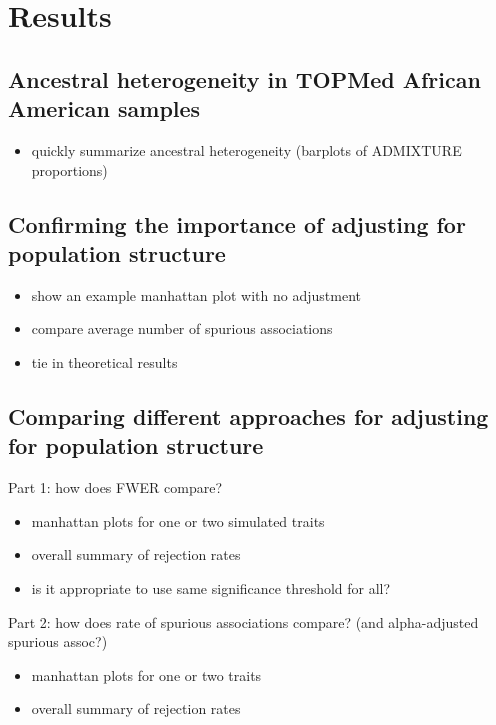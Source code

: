\documentclass[12pt]{article}
\begin{document}
\section{Results}

\subsection{Ancestral heterogeneity in TOPMed African American samples}

\begin{itemize}
\item quickly summarize ancestral heterogeneity (barplots of ADMIXTURE proportions)
\end{itemize}


\subsection{Confirming the importance of adjusting for population structure}

\begin{itemize}
\item show an example manhattan plot with no adjustment
\item compare average number of spurious associations
\item tie in theoretical results
\end{itemize}

\subsection{Comparing different approaches for adjusting for population structure}

Part 1: how does FWER compare?

\begin{itemize}
\item manhattan plots for one or two simulated traits
\item overall summary of rejection rates
\item is it appropriate to use same significance threshold for all?
\end{itemize}

\noindent Part 2: how does rate of spurious associations compare? (and alpha-adjusted spurious assoc?)

\begin{itemize}
\item manhattan plots for one or two traits
\item overall summary of rejection rates
\end{itemize}
\end{document}
